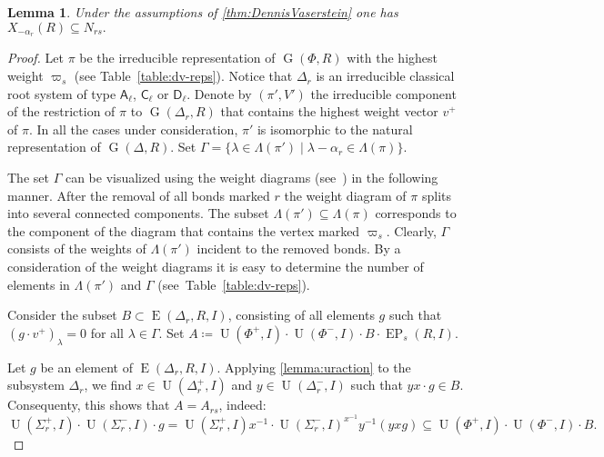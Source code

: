 \documentclass[11pt]{amsart}
\theoremstyle{plain}
\numberwithin{equation}{section}
\newtheorem{lemma}{Lemma}
\numberwithin{lemma}{section}
\theoremstyle{definition}
\theoremstyle{remark}
\DeclareMathOperator{\G}{G}
\DeclareMathOperator{\E}{E}
\DeclareMathOperator{\EP}{EP}
\DeclareMathOperator{\U}{U}
\newcommand{\rA}{\mathsf{A}}
\newcommand{\rC}{\mathsf{C}}
\newcommand{\rD}{\mathsf{D}}
\begin{document}
\begin{lemma}\label{lemma:Stein_reduction}
Under the assumptions of \cref{thm:DennisVaserstein} one has $X_{-\alpha_r}(R) \subseteq N_{rs}.$
\end{lemma}
\begin{proof}
Let $\pi$ be the irreducible representation of $\G(\Phi, R)$ with the highest weight $\varpi_s$ (see Table~\ref{table:dv-reps}).
Notice that $\Delta_r$ is an irreducible classical root system of type $\rA_\ell$, $\rC_\ell$ or $\rD_\ell$.
Denote by $(\pi', V')$ the irreducible component of the restriction of $\pi$ to $\G(\Delta_r, R)$ that contains the highest weight vector $v^+$ of $\pi$.
In all the cases under consideration, $\pi'$ is isomorphic to the natural representation of $\G(\Delta, R)$.
Set $\Gamma = \{\lambda \in \Lambda(\pi') \mid \lambda - \alpha_r \in \Lambda(\pi) \}.$

The set $\Gamma$ can be visualized using the weight diagrams (see~\cite{PSV98}) in the following manner.
After the removal of all bonds marked $r$ the weight diagram of $\pi$ splits into several connected components.
The subset $\Lambda(\pi') \subseteq \Lambda(\pi)$ corresponds to the component of the diagram that contains the vertex marked $\varpi_s$.
Clearly, $\Gamma$ consists of the weights of $\Lambda(\pi')$ incident to the removed bonds.
By a consideration of the weight diagrams it is easy to determine the number of elements in $\Lambda(\pi')$ and $\Gamma$ (see~Table~\ref{table:dv-reps}).

Consider the subset $B \subset \E(\Delta_r, R, I)$, consisting of all elements $g$ such that $(g \cdot v^+)_\lambda = 0$ for all $\lambda\in\Gamma$.
Set $A\coloneqq\U(\Phi^+, I)\cdot \U(\Phi^-, I) \cdot B \cdot \EP_s(R, I).$

Let $g$ be an element of $\E(\Delta_r, R, I)$. Applying \cref{lemma:uraction} to the subsystem $\Delta_r$, we find
$x\in\U(\Delta_r^+, I)$ and $y\in \U(\Delta_r^-, I)$ such that $yx\cdot g \in B$.
Consequenty, this shows that $A = A_{rs}$, indeed:
\begin{equation*} \U(\Sigma^+_r, I) \cdot \U(\Sigma^-_r, I) \cdot g = \U(\Sigma^+_r, I) x^{-1} \cdot \U(\Sigma^-_r, I)^{x^{-1}} y^{-1} (yxg) \subseteq \U(\Phi^+, I) \cdot \U(\Phi^-, I) \cdot B. \end{equation*}


\end{proof}
\end{document}
